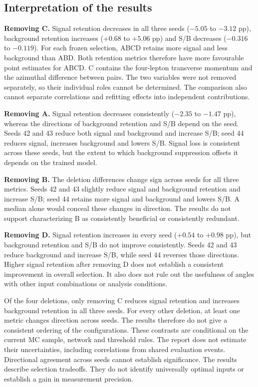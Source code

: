 \documentclass[11pt,a4paper]{article}
\begin{document}
\subsection{Interpretation of the results}
\textbf{Removing C.}
Signal retention decreases in all three seeds ($-5.05$ to $-3.12$ pp), background retention increases ($+0.68$ to $+5.06$ pp) and S/B decreases ($-0.316$ to $-0.119$).
For each frozen selection, ABCD retains more signal and less background than ABD. Both retention metrics therefore have more favourable point estimates for ABCD.
C contains the four-lepton transverse momentum and the azimuthal difference between pairs.
The two variables were not removed separately, so their individual roles cannot be determined. The comparison also cannot separate correlations and refitting effects into independent contributions.

\textbf{Removing A.}
Signal retention decreases consistently ($-2.35$ to $-1.47$ pp), whereas the directions of background retention and S/B depend on the seed.
Seeds 42 and 43 reduce both signal and background and increase S/B; seed 44 reduces signal, increases background and lowers S/B.
Signal loss is consistent across these seeds, but the extent to which background suppression offsets it depends on the trained model.

\textbf{Removing B.}
The deletion differences change sign across seeds for all three metrics.
Seeds 42 and 43 slightly reduce signal and background retention and increase S/B; seed 44 retains more signal and background and lowers S/B.
A median alone would conceal these changes in direction.
The results do not support characterizing B as consistently beneficial or consistently redundant.

\textbf{Removing D.}
Signal retention increases in every seed ($+0.54$ to $+0.98$ pp), but background retention and S/B do not improve consistently.
Seeds 42 and 43 reduce background and increase S/B, while seed 44 reverses those directions.
Higher signal retention after removing D does not establish a consistent improvement in overall selection. It also does not rule out the usefulness of angles with other input combinations or analysis conditions.

Of the four deletions, only removing C reduces signal retention and increases background retention in all three seeds.
For every other deletion, at least one metric changes direction across seeds. The results therefore do not give a consistent ordering of the configurations.
These contrasts are conditional on the current MC sample, network and threshold rules. The report does not estimate their uncertainties, including correlations from shared evaluation events.
Directional agreement across seeds cannot establish significance.
The results describe selection tradeoffs. They do not identify universally optimal inputs or establish a gain in measurement precision.
\FloatBarrier
\end{document}

